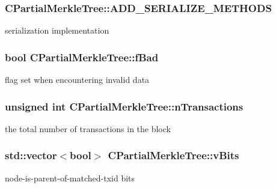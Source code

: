 \subsubsection[{A\+D\+D\+\_\+\+S\+E\+R\+I\+A\+L\+I\+Z\+E\+\_\+\+M\+E\+T\+H\+O\+D\+S}]{\setlength{\rightskip}{0pt plus 5cm}C\+Partial\+Merkle\+Tree\+::\+A\+D\+D\+\_\+\+S\+E\+R\+I\+A\+L\+I\+Z\+E\+\_\+\+M\+E\+T\+H\+O\+D\+S}\label{class_c_partial_merkle_tree_ae218db8103edb6672fe0d642535c7490}
serialization implementation \hypertarget{class_c_partial_merkle_tree_a24bb0d9d17d6001dcfbca4d550c64ba3}{}
\subsubsection[{f\+Bad}]{\setlength{\rightskip}{0pt plus 5cm}bool C\+Partial\+Merkle\+Tree\+::f\+Bad\hspace{0.3cm}{\ttfamily [protected]}}\label{class_c_partial_merkle_tree_a24bb0d9d17d6001dcfbca4d550c64ba3}
flag set when encountering invalid data \hypertarget{class_c_partial_merkle_tree_a0d3bd530f19f2c75c140a05c6f99782a}{}
\subsubsection[{n\+Transactions}]{\setlength{\rightskip}{0pt plus 5cm}unsigned int C\+Partial\+Merkle\+Tree\+::n\+Transactions\hspace{0.3cm}{\ttfamily [protected]}}\label{class_c_partial_merkle_tree_a0d3bd530f19f2c75c140a05c6f99782a}
the total number of transactions in the block \hypertarget{class_c_partial_merkle_tree_a22a522d1fb8d449f4c91b65283339e7d}{}
\subsubsection[{v\+Bits}]{\setlength{\rightskip}{0pt plus 5cm}std\+::vector$<$bool$>$ C\+Partial\+Merkle\+Tree\+::v\+Bits\hspace{0.3cm}{\ttfamily [protected]}}\label{class_c_partial_merkle_tree_a22a522d1fb8d449f4c91b65283339e7d}
node-\/is-\/parent-\/of-\/matched-\/txid bits \hypertarget{class_c_partial_merkle_tree_a863cf9024be1b8fa97db08dfd6dbd687}{}
